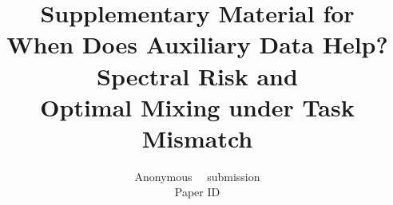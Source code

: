 \documentclass[10pt,letterpaper]{article}
\title{Supplementary Material for\\
When Does Auxiliary Data Help? Spectral Risk and\\
Optimal Mixing under Task Mismatch}
\author{Anonymous \confName~\confYear~submission\\
Paper ID \paperID
}
\begin{document}
\maketitle
\appendix

{
    \small
    
    
}
\end{document}
